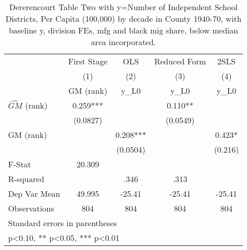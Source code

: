 \begin{table}[htbp]\centering
\def\sym#1{\ifmmode^{#1}\else\(^{#1}\)\fi}
\caption{Dererencourt Table Two with y=Number of Independent School Districts, Per Capita (100,000) by decade in County 1940-70, with baseline y, division FEs, mfg and black mig share, below median area incorporated.}
\begin{tabular}{l*{4}{c}}
\toprule
                    & First Stage   &         OLS   &Reduced Form   &        2SLS   \\
                    &\multicolumn{1}{c}{(1)}&\multicolumn{1}{c}{(2)}&\multicolumn{1}{c}{(3)}&\multicolumn{1}{c}{(4)}\\
                    &\multicolumn{1}{c}{GM  (rank)}&\multicolumn{1}{c}{y\_L0}&\multicolumn{1}{c}{y\_L0}&\multicolumn{1}{c}{y\_L0}\\
\midrule
$\hat{GM}$ (rank)   &       0.259***&               &       0.110** &               \\
                    &    (0.0827)   &               &    (0.0549)   &               \\
\addlinespace
GM  (rank)          &               &       0.208***&               &       0.423*  \\
                    &               &    (0.0504)   &               &     (0.216)   \\
\midrule
F-Stat              &      20.309   &               &               &               \\
R-squared           &               &        .346   &        .313   &               \\
Dep Var Mean        &      49.995   &      -25.41   &      -25.41   &      -25.41   \\
Observations        &         804   &         804   &         804   &         804   \\
\bottomrule
\multicolumn{5}{l}{\footnotesize Standard errors in parentheses}\\
\multicolumn{5}{l}{\footnotesize * p<0.10, ** p<0.05, *** p<0.01}\\
\end{tabular}
\end{table}
